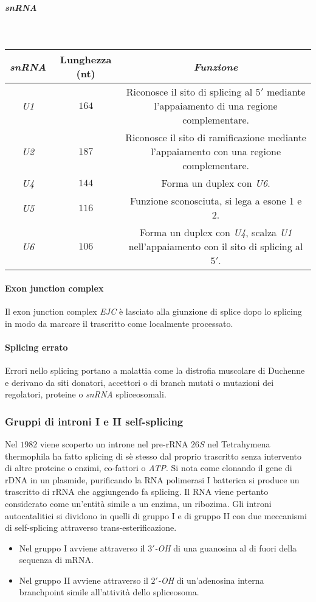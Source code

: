 \subparagraph{\emph{snRNA}}\mbox{}\\
\begin{center}
\begin{tabular}{|c|c|c|}
	\hline
	\emph{\textbf{snRNA}} & \textbf{Lunghezza (nt)} & \emph{Funzione}\\
	\hline
	\emph{U1} & $164$ & \makecell{Riconosce il sito di splicing al $5'$ mediante \\l'appaiamento di una regione complementare.} \\
	\hline
	\emph{U2} & $187$ & \makecell{Riconosce il sito di ramificazione mediante \\l'appaiamento con una regione complementare.}\\
	\hline
	\emph{U4} & $144$ & Forma un duplex con \emph{U6}.\\
	\hline
	\emph{U5} & $116$ & Funzione sconosciuta, si lega a esone 1 e 2.\\
	\hline
	\emph{U6} & $106$ & \makecell{Forma un duplex con \emph{U4}, scalza \emph{U1} \\nell'appaiamento con il sito di splicing al $5'$.}\\
	\hline
\end{tabular}
\end{center}
\paragraph{Exon junction complex}
Il exon junction complex \emph{EJC} \`e lasciato alla giunzione di splice dopo lo splicing in modo da marcare il trascritto come localmente processato. 
\paragraph{Splicing errato}
Errori nello splicing portano a malattia come la distrofia muscolare di Duchenne e derivano da siti donatori, accettori o di branch mutati o mutazioni dei regolatori, proteine o 
\emph{snRNA} spliceosomali. 
\subsubsection{Gruppi di introni I e II self-splicing}
Nel $1982$ viene scoperto un introne nel pre-rRNA $26S$ nel Tetrahymena thermophila ha fatto splicing di s\`e stesso dal proprio trascritto senza intervento di altre proteine o enzimi, 
co-fattori o \emph{ATP}. Si nota come clonando il gene di rDNA in un plasmide, purificando la RNA polimerasi I batterica si produce un trascritto di rRNA che aggiungendo 
\emph{} fa splicing. Il RNA viene pertanto considerato come un'entit\`a simile a un enzima, un ribozima. Gli introni autocatalitici si dividono in quelli di gruppo I e di 
gruppo II con due meccanismi di self-splicing attraverso trans-esterificazione.
\begin{itemize}
	\item Nel gruppo I avviene attraverso il \emph{$3'$-OH} di una guanosina al di fuori della sequenza di mRNA.
	\item Nel gruppo II avviene attraverso il \emph{$2'$-OH} di un'adenosina interna branchpoint simile all'attivit\`a dello spliceosoma. 
\end{itemize}
